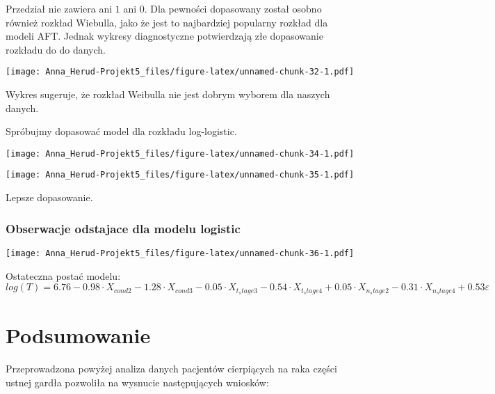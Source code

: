 \documentclass[
]{article}
\begin{document}
Przedział nie zawiera ani \(1\) ani \(0\). Dla pewności dopasowany
został osobno również rozkład Wiebulla, jako że jest to najbardziej
popularny rozkład dla modeli AFT. Jednak wykresy diagnostyczne
potwierdzają złe dopasowanie rozkładu do do danych.

\texttt{[image: Anna\_Herud-Projekt5\_files/figure-latex/unnamed-chunk-32-1.pdf]}

Wykres sugeruje, że rozkład Weibulla nie jest dobrym wyborem dla naszych
danych.

Spróbujmy dopasować model dla rozkładu log-logistic.

\texttt{[image: Anna\_Herud-Projekt5\_files/figure-latex/unnamed-chunk-34-1.pdf]}

\texttt{[image: Anna\_Herud-Projekt5\_files/figure-latex/unnamed-chunk-35-1.pdf]}

Lepsze dopasowanie.

\hypertarget{obserwacje-odstajace-dla-modelu-logistic}{%
\subsubsection{Obserwacje odstajace dla modelu
logistic}\label{obserwacje-odstajace-dla-modelu-logistic}}

\texttt{[image: Anna\_Herud-Projekt5\_files/figure-latex/unnamed-chunk-36-1.pdf]}

Ostateczna postać modelu: \[
log(T) = 6.76 -0.98\cdot X_{cond2} - 1.28\cdot X_{cond3} - 0.05\cdot X_{t_stage3} - 0.54\cdot X_{t_stage4}+ 0.05 \cdot X_{n_stage2} - 0.31 \cdot X_{n_stage4}+0.53 \varepsilon
\]

\hypertarget{podsumowanie}{%
\section{Podsumowanie}\label{podsumowanie}}

Przeprowadzona powyżej analiza danych pacjentów cierpiących na raka
części ustnej gardła pozwoliła na wysnucie następujących wniosków:
\end{document}
